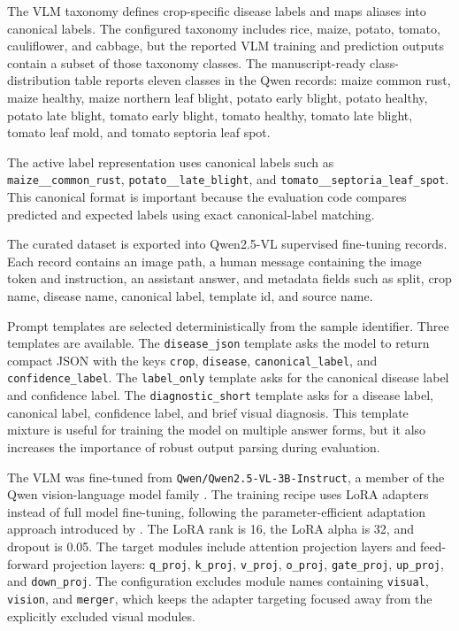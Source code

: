 
The VLM taxonomy defines crop-specific disease labels and maps aliases into canonical labels. The
configured taxonomy includes rice, maize, potato, tomato, cauliflower, and cabbage, but the
reported VLM training and prediction outputs contain a subset of those taxonomy classes. The
manuscript-ready class-distribution table reports eleven classes in the Qwen records: maize common rust,
maize healthy, maize northern leaf blight, potato early blight, potato healthy, potato late blight,
tomato early blight, tomato healthy, tomato late blight, tomato leaf mold, and tomato septoria
leaf spot.

The active label representation uses canonical labels such as \texttt{maize\_\_common\_rust},
\texttt{potato\_\_late\_blight}, and \texttt{tomato\_\_septoria\_leaf\_spot}. This canonical
format is important because the evaluation code compares predicted and expected labels using
exact canonical-label matching.


The curated dataset is exported into Qwen2.5-VL supervised fine-tuning records. Each record
contains an image path, a human message containing the image token and instruction, an assistant
answer, and metadata fields such as split, crop name, disease name, canonical label, template id,
and source name.

Prompt templates are selected deterministically from the sample identifier. Three templates are
available. The \texttt{disease\_json} template asks the model to return compact JSON with the
keys \texttt{crop}, \texttt{disease}, \texttt{canonical\_label}, and
\texttt{confidence\_label}. The \texttt{label\_only} template asks for the canonical disease label
and confidence label. The \texttt{diagnostic\_short} template asks for a disease label, canonical
label, confidence label, and brief visual diagnosis. This template mixture is useful for training
the model on multiple answer forms, but it also increases the importance of robust output parsing
during evaluation.



The VLM was fine-tuned from \texttt{Qwen/Qwen2.5-VL-3B-Instruct}, a member of the Qwen
vision-language model family \parencite{bai2025qwen25vl}. The training recipe uses LoRA
adapters instead of full model fine-tuning, following the parameter-efficient adaptation approach
introduced by \textcite{hu2021lora}. The LoRA rank is 16, the LoRA alpha is 32, and dropout is
0.05. The target modules include attention projection layers and feed-forward projection
layers: \texttt{q\_proj}, \texttt{k\_proj}, \texttt{v\_proj}, \texttt{o\_proj},
\texttt{gate\_proj}, \texttt{up\_proj}, and \texttt{down\_proj}. The configuration excludes
module names containing \texttt{visual}, \texttt{vision}, and \texttt{merger}, which keeps the
adapter targeting focused away from the explicitly excluded visual modules.

